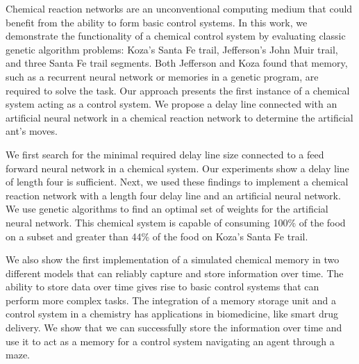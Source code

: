 Chemical reaction networks are an unconventional computing medium that could benefit from the ability to form basic control systems. In this work, we demonstrate the functionality of a chemical control system by evaluating classic genetic algorithm problems: Koza's Santa Fe trail, Jefferson's John Muir trail, and three Santa Fe trail segments. Both Jefferson and Koza found that memory, such as a recurrent neural network or memories in a genetic program, are required to solve the task. Our approach presents the first instance of a chemical system acting as a control system. We propose a delay line connected with an artificial neural network in a chemical reaction network to determine the artificial ant's moves. 

We first search for the minimal required delay line size connected to a feed forward neural network in a chemical system. Our experiments show a delay line of length four is sufficient. Next, we used these findings to implement a chemical reaction network with a length four delay line and an artificial neural network. We use genetic algorithms to find an optimal set of weights for the artificial neural network. This chemical system is capable of consuming 100\% of the food on a subset and greater than 44\% of the food on Koza's Santa Fe trail.

We also show the first implementation of a simulated chemical memory in two different models that can reliably capture and store information over time. The ability to store data over time gives rise to basic control systems that can perform more complex tasks. The integration of a memory storage unit and a control system in a chemistry has applications in biomedicine, like smart drug delivery. We show that we can successfully store the information over time and use it to act as a memory for a control system navigating an agent through a maze. 